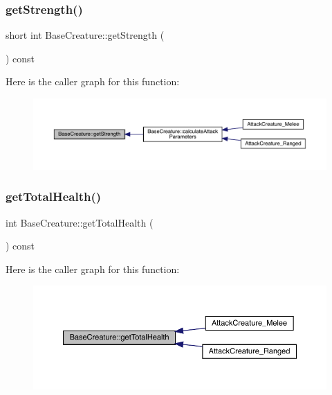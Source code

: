 \subsubsection{\texorpdfstring{get\+Strength()}{getStrength()}}
{\footnotesize\ttfamily short int Base\+Creature\+::get\+Strength (\begin{DoxyParamCaption}{ }\end{DoxyParamCaption}) const}

Here is the caller graph for this function\+:
\nopagebreak
\begin{figure}[H]
\begin{center}
\leavevmode
\includegraphics[width=350pt]{d2/d3b/class_base_creature_a1232a2ecb3199fe79627df912078f24e_icgraph}
\end{center}
\end{figure}
\mbox{\label{class_base_creature_accab7a878eae0580476b282ce2c556d3}} 
\subsubsection{\texorpdfstring{get\+Total\+Health()}{getTotalHealth()}}
{\footnotesize\ttfamily int Base\+Creature\+::get\+Total\+Health (\begin{DoxyParamCaption}{ }\end{DoxyParamCaption}) const}

Here is the caller graph for this function\+:
\nopagebreak
\begin{figure}[H]
\begin{center}
\leavevmode
\includegraphics[width=350pt]{d2/d3b/class_base_creature_accab7a878eae0580476b282ce2c556d3_icgraph}
\end{center}
\end{figure}
\mbox{\label{class_base_creature_a8a960bc7a7689f5633b1abaa82fa6e95}} 
